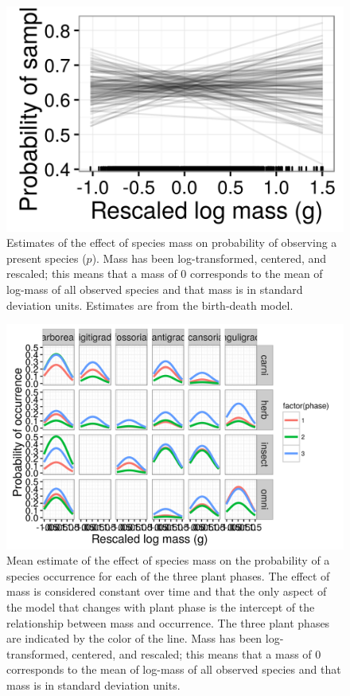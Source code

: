 \documentclass[12pt,letterpaper]{article}
\begin{document}
\begin{figure}[ht]
  \centering
  \includegraphics[width=\textwidth,height=0.8\textheight,keepaspectratio=true]{figure/mass_on_samp_bd}
  \caption[Estimates of the effect of mass on observation probability from the birth-death model]{Estimates of the effect of species mass on probability of observing a present species (\(p\)). Mass has been log-transformed, centered, and rescaled; this means that a mass of 0 corresponds to the mean of log-mass of all observed species and that mass is in standard deviation units. Estimates are from the birth-death model.}
  \label{fig:mass_preserve_bd}
\end{figure}

\begin{figure}[ht]
  \centering
  \includegraphics[width=\textwidth,height=0.8\textheight,keepaspectratio=true]{figure/mass_on_pres}
  \caption[Effect of mass on probability of species occurrence as estimated from the pure-presence model]{Mean estimate of the effect of species mass on the probability of a species occurrence for each of the three plant phases. The effect of mass is considered constant over time and that the only aspect of the model that changes with plant phase is the intercept of the relationship between mass and occurrence. The three plant phases are indicated by the color of the line. Mass has been log-transformed, centered, and rescaled; this means that a mass of 0 corresponds to the mean of log-mass of all observed species and that mass is in standard deviation units.}
  \label{fig:mass_occur}
\end{figure}
\end{document}
